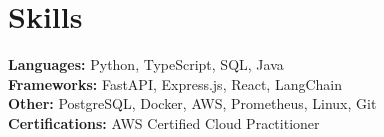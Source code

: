 \documentclass[letterpaper,11pt]{article}
\begin{document}
\section{Skills}
  \begin{itemize}[leftmargin=0.15in, label={}]
    \small{\item{
        \textbf{Languages:}{ Python, TypeScript, SQL, Java} \\
        \textbf{Frameworks:}{ FastAPI, Express.js, React, LangChain} \\
        \textbf{Other:}{ PostgreSQL, Docker, AWS, Prometheus, Linux, Git} \\
        \textbf{Certifications:}{ AWS Certified Cloud Practitioner}
    }}
  \end{itemize}

\end{document}

